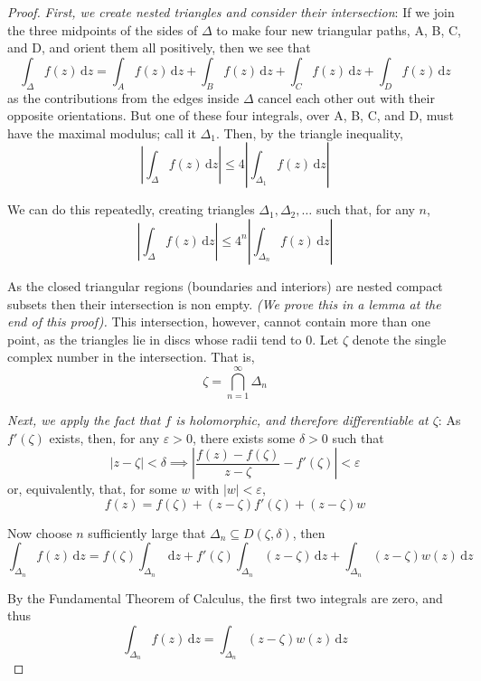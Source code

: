 \documentclass[10pt,fleqn]{article}
\newcommand{\diff}{\,\mathrm{d}}
\newcommand{\eps}{\varepsilon}
\theoremstyle{definition} \newtheorem{defn}{Definition}[section]
\theoremstyle{plain}      \newtheorem{thm}[defn]{Theorem}
\theoremstyle{definition} \newtheorem{prop}[defn]{Proposition}
\theoremstyle{plain}      \newtheorem{lem}[defn]{Lemma}
\theoremstyle{definition} \newtheorem{cor}[defn]{Corollary}
\theoremstyle{definition} \newtheorem{ex}[defn]{Example}
\theoremstyle{definition} \newtheorem{rem}[defn]{Remark}
\begin{document}
\begin{proof}
    \emph{First, we create nested triangles and consider their intersection}:
    If we join the three midpoints of the sides of $\Delta$ to make four new triangular paths, A, B, C, and D, and orient them all positively, then we see that
    \[
        \int_{\Delta} f(z)\diff z=
        \int_A f(z)\diff z + \int_B f(z)\diff z + \int_C f(z)\diff z + \int_D f(z)\diff z
    \]
    as the contributions from the edges inside $\Delta$ cancel each other out with their opposite orientations.
    But one of these four integrals, over A, B, C, and D, must have the maximal modulus; call it $\Delta_1$.
    Then, by the triangle inequality,
    \[
        \left|\int_{\Delta} f(z)\diff z\right|\leq
        4\left|\int_{\Delta_1} f(z)\diff z\right|
    \]

    We can do this repeatedly, creating triangles $\Delta_1,\Delta_2,\ldots$ such that, for any $n$,
    \[
        \left|\int_{\Delta} f(z)\diff z\right|\leq
        4^n\left|\int_{\Delta_n} f(z)\diff z\right|        
    \]

    As the closed triangular regions (boundaries and interiors) are nested compact subsets then their intersection is non empty.
    \emph{(We prove this in a lemma at the end of this proof).}
    This intersection, however, cannot contain more than one point, as the triangles lie in discs whose radii tend to $0$.
    Let $\zeta$ denote the single complex number in the intersection.
    That is,
    \[
        \zeta=
        \bigcap_{n=1}^{\infty}\Delta_n
    \]

    \emph{Next, we apply the fact that $f$ is holomorphic, and therefore differentiable at $\zeta$}:
    As $f'(\zeta)$ exists, then, for any $\eps>0$, there exists some $\delta>0$ such that
    \[
        |z-\zeta|<\delta\implies
        \left|\frac{f(z)-f(\zeta)}{z-\zeta}-f'(\zeta)\right|<\eps
    \]
    or, equivalently, that, for some $w$ with $|w|<\eps$,
    \[
        f(z)=
        f(\zeta)+(z-\zeta)f'(\zeta)+(z-\zeta)w
    \]

    Now choose $n$ sufficiently large that $\Delta_n\subseteq D(\zeta,\delta)$, then
    \[
        \int_{\Delta_n} f(z)\diff z=
        f(\zeta)\int_{\Delta_n} \diff z+
        f'(\zeta)\int_{\Delta_n} (z-\zeta)\diff z+
        \int_{\Delta_n} (z-\zeta)w(z)\diff z
    \]

    By the Fundamental Theorem of Calculus, the first two integrals are zero, and thus
    \[
        \int_{\Delta_n} f(z)\diff z=
        \int_{\Delta_n} (z-\zeta)w(z)\diff z
    \]


\end{proof}
\end{document}
